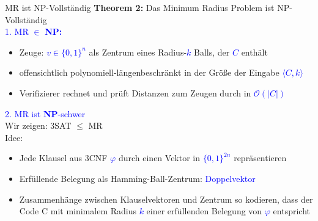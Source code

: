 \documentclass[10pt, aspectratio=169]{beamer}
\begin{document}
\begin{frame}{MR ist NP-Vollständig}
\textbf{Theorem 2:} Das Minimum Radius Problem ist \alert{NP-Vollständig}\\
\textcolor{blue}{1. MR $\in$ \textbf{NP:}}
\begin{itemize}
    \item Zeuge: \textcolor{blue}{$v \in \{0,1\}^n$} als Zentrum eines Radius-\textcolor{blue}{$k$} Balls, der \textcolor{blue}{$C$} enthält
    \item offensichtlich \alert{polynomiell-längenbeschränkt} in der Größe der Eingabe \textcolor{blue}{$\langle C,k \rangle$}
    \item Verifizierer rechnet und prüft Distanzen zum
    Zeugen durch in \textcolor{blue}{$\mathcal{O}(|C|)$}
    \end{itemize}
\pause
\textcolor{blue}{2. MR ist \textbf{NP}-schwer}\\
Wir zeigen: \alert{3SAT $\leq$ MR}\\
Idee: 
\begin{itemize}
    \item Jede Klausel aus 3CNF \textcolor{blue}{$\varphi$} durch einen Vektor in \textcolor{blue}{$\{0,1\}^{2n}$} repräsentieren 
\item Erfüllende Belegung als \alert{Hamming-Ball-Zentrum}: \textcolor{blue}{Doppelvektor}
    \item Zusammenhänge zwischen Klauselvektoren und Zentrum so kodieren, dass der Code C mit minimalem Radius \textcolor{blue}{$k$} einer erfüllenden Belegung von \textcolor{blue}{$\varphi$} entspricht
\end{itemize}
\end{frame}
\end{document}
